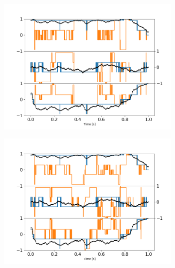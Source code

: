 \documentclass[preprint,  3p]{elsarticle}
\begin{document}
\begin{figure}[h]
	\centering
	\begin{subfigure}{0.33\textwidth}
			\subcaption{}
			\includegraphics[width =\textwidth]{./Images/fig8a.png}
	\end{subfigure}
	\begin{subfigure}{0.31\textwidth}
		\subcaption{}
		\includegraphics[width=\textwidth]{./Images/fig8b.png}
	\end{subfigure}
	\begin{subfigure}{0.31\textwidth}
		\subcaption{}

\end{subfigure}
\end{figure}
\end{document}
